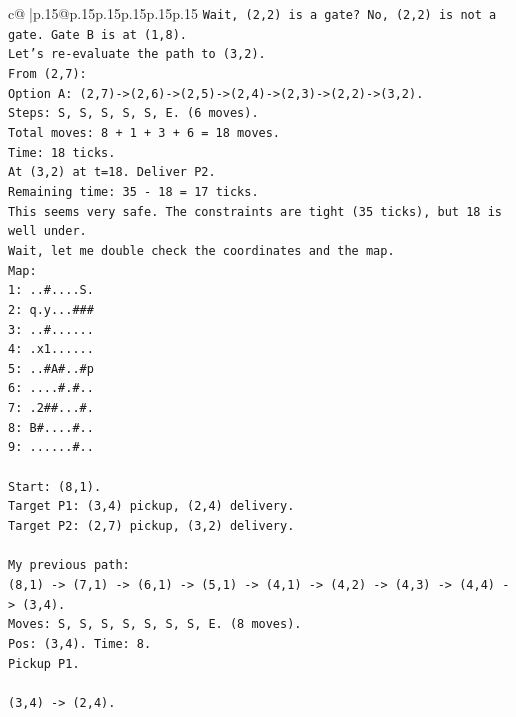 \documentclass{article}
\begin{document}
{\begin{supertabular}{c@{$\;$}|p{.15\linewidth}@{}p{.15\linewidth}p{.15\linewidth}p{.15\linewidth}p{.15\linewidth}p{.15\linewidth}}
{{{\texttt{Wait, (2,2) is a gate? No, (2,2) is not a gate. Gate B is at (1,8).} \\
\texttt{Let's re{-}evaluate the path to (3,2).} \\
\texttt{From (2,7):} \\
\texttt{Option A: (2,7){-}>(2,6){-}>(2,5){-}>(2,4){-}>(2,3){-}>(2,2){-}>(3,2).} \\
\texttt{Steps: S, S, S, S, S, E. (6 moves).} \\
\texttt{Total moves: 8 + 1 + 3 + 6 = 18 moves.} \\
\texttt{Time: 18 ticks.} \\
\texttt{At (3,2) at t=18. Deliver P2.} \\
\texttt{Remaining time: 35 {-} 18 = 17 ticks.} \\
\texttt{This seems very safe. The constraints are tight (35 ticks), but 18 is well under.} \\
\texttt{Wait, let me double check the coordinates and the map.} \\
\texttt{Map:} \\
\texttt{1: ..\#....S.} \\
\texttt{2: q.y...\#\#\#} \\
\texttt{3: ..\#......} \\
\texttt{4: .x1......} \\
\texttt{5: ..\#A\#..\#p} \\
\texttt{6: ....\#.\#..} \\
\texttt{7: .2\#\#...\#.} \\
\texttt{8: B\#....\#..} \\
\texttt{9: ......\#..} \\
\\ 
\texttt{Start: (8,1).} \\
\texttt{Target P1: (3,4) pickup, (2,4) delivery.} \\
\texttt{Target P2: (2,7) pickup, (3,2) delivery.} \\
\\ 
\texttt{My previous path:} \\
\texttt{(8,1) {-}> (7,1) {-}> (6,1) {-}> (5,1) {-}> (4,1) {-}> (4,2) {-}> (4,3) {-}> (4,4) {-}> (3,4).} \\
\texttt{Moves: S, S, S, S, S, S, S, E. (8 moves).} \\
\texttt{Pos: (3,4). Time: 8.} \\
\texttt{Pickup P1.} \\
\\ 
\texttt{(3,4) {-}> (2,4).} \\
}}}
\end{supertabular}}
\end{document}
